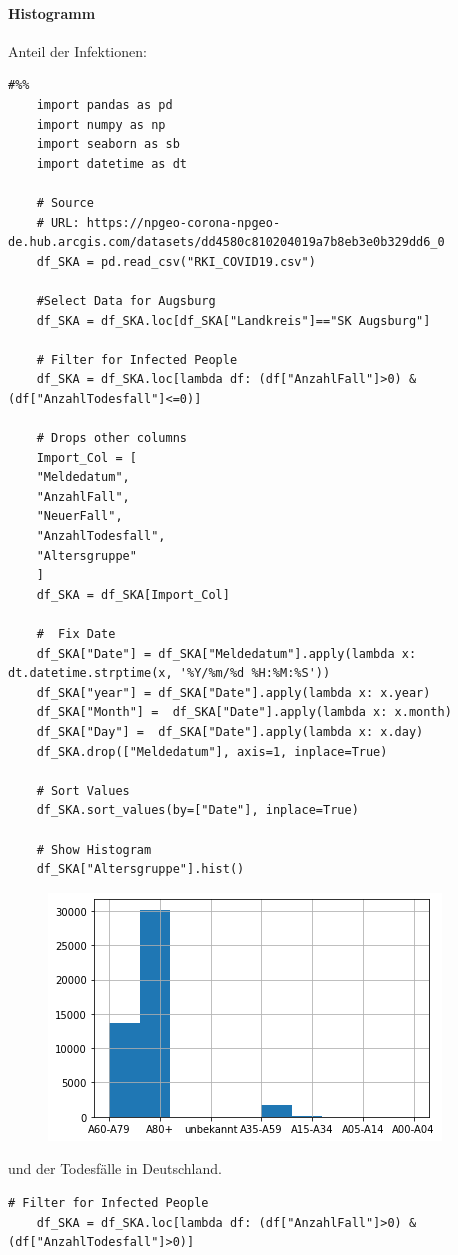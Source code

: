 \paragraph{Histogramm}
Anteil der Infektionen:
\begin{lstlisting}[style=python]
	#%%
	import pandas as pd
	import numpy as np
	import seaborn as sb
	import datetime as dt
	
	# Source
	# URL: https://npgeo-corona-npgeo-de.hub.arcgis.com/datasets/dd4580c810204019a7b8eb3e0b329dd6_0
	df_SKA = pd.read_csv("RKI_COVID19.csv")
	
	#Select Data for Augsburg
	df_SKA = df_SKA.loc[df_SKA["Landkreis"]=="SK Augsburg"]
	
	# Filter for Infected People
	df_SKA = df_SKA.loc[lambda df: (df["AnzahlFall"]>0) & (df["AnzahlTodesfall"]<=0)]
	
	# Drops other columns
	Import_Col = [
	"Meldedatum",
	"AnzahlFall",
	"NeuerFall",
	"AnzahlTodesfall",
	"Altersgruppe"
	]
	df_SKA = df_SKA[Import_Col]
	
	#  Fix Date
	df_SKA["Date"] = df_SKA["Meldedatum"].apply(lambda x: dt.datetime.strptime(x, '%Y/%m/%d %H:%M:%S'))
	df_SKA["year"] = df_SKA["Date"].apply(lambda x: x.year)
	df_SKA["Month"] =  df_SKA["Date"].apply(lambda x: x.month)
	df_SKA["Day"] =  df_SKA["Date"].apply(lambda x: x.day)
	df_SKA.drop(["Meldedatum"], axis=1, inplace=True)
	
	# Sort Values
	df_SKA.sort_values(by=["Date"], inplace=True)
	
	# Show Histogram
	df_SKA["Altersgruppe"].hist()
\end{lstlisting}
\begin{figure}[H]
	\centering
	\includegraphics[scale = 0.8]{attachment/chapter_3/Scc082}
\end{figure} 
und der Todesfälle in Deutschland.
\begin{lstlisting}[style=python]
	# Filter for Infected People
	df_SKA = df_SKA.loc[lambda df: (df["AnzahlFall"]>0) & (df["AnzahlTodesfall"]>0)]
\end{lstlisting}
